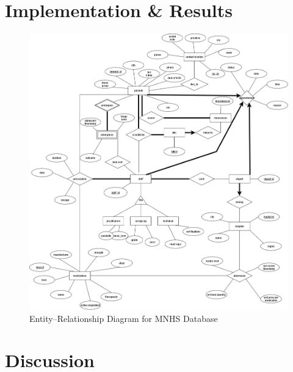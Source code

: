 \documentclass[a4paper,12pt]{article}
\begin{document}
\section{Implementation \& Results}
\begin{figure}  %
  \centering
  \includegraphics[width=\textwidth,height=\textheight,keepaspectratio]{Figures/ER Diagram.png}
  \caption{Entity–Relationship Diagram for MNHS Database}
  \label{fig:erd}
\end{figure}
\newpage

\section{Discussion}
\end{document}

